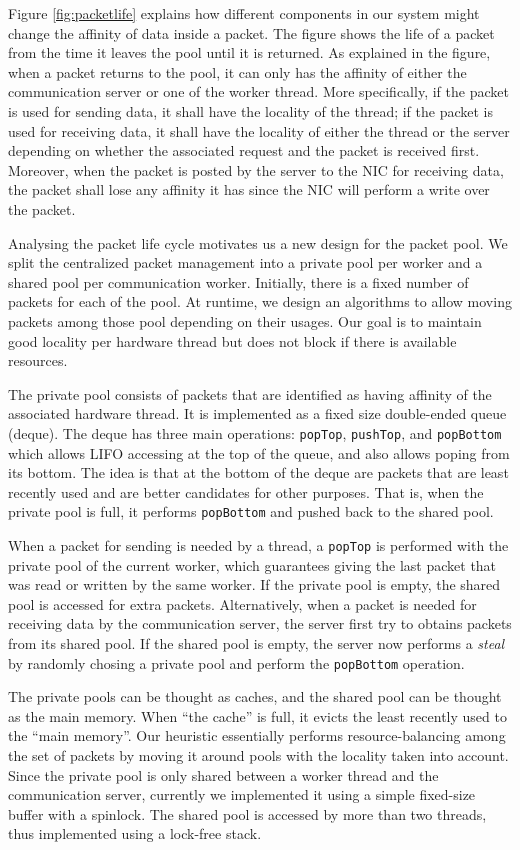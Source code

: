Figure \ref{fig:packetlife} explains how different components in our system
might change the affinity of data inside a packet. The figure shows the life of
a packet from the time it leaves the pool until it is returned. As explained in
the figure, when a packet returns to the pool, it can only has the affinity
of either the communication server or one of the worker thread. More specifically,
if the packet is used for sending data, it shall have the locality of the thread;
if the packet is used for receiving data, it shall have the locality of either
the thread or the server depending on whether the associated request and the
packet is received first. Moreover, when the packet is posted by the server
to the NIC for receiving data, the packet shall lose any affinity it has since
the NIC will perform a write over the packet.

Analysing the packet life cycle motivates us a new design for the packet pool.
We split the centralized packet management into a private pool per worker and a
shared pool per communication worker. Initially, there is a fixed number of
packets for each of the pool. At runtime, we design an algorithms to allow
moving packets among those pool depending on their usages.  Our goal is to
maintain good locality per hardware thread but does not block if there is
available resources.

The private pool consists of packets that are identified as having affinity of
the associated hardware thread. It is implemented as a fixed size double-ended
queue (deque). The deque has three main operations: \texttt{popTop},
\texttt{pushTop}, and \texttt{popBottom} which allows LIFO accessing at the top
of the queue, and also allows poping from its bottom. The idea is that at the
bottom of the deque are packets that are least recently used and are better
candidates for other purposes. That is, when the private pool is full, it
performs \texttt{popBottom} and pushed back to the shared pool.

When a packet for sending is needed by a thread, a \texttt{popTop} is performed
with the private pool of the current worker, which guarantees giving the last
packet that was read or written by the same worker. If the private pool is
empty, the shared pool is accessed for extra packets.  Alternatively, when a
packet is needed for receiving data by the communication server, the server
first try to obtains packets from its shared pool. If the shared pool is empty,
the server now performs a \textit{steal} by randomly chosing a private pool and
perform the \texttt{popBottom} operation.

The private pools can be thought as caches, and the shared pool can be thought
as the main memory. When ``the cache'' is full, it evicts the least recently
used to the ``main memory''. Our heuristic essentially performs
resource-balancing among the set of packets by moving it around pools with the
locality taken into account. Since the private pool is only shared between a
worker thread and the communication server, currently we implemented it using a
simple fixed-size buffer with a spinlock. The shared pool is accessed by more
than two threads, thus implemented using a lock-free stack.
